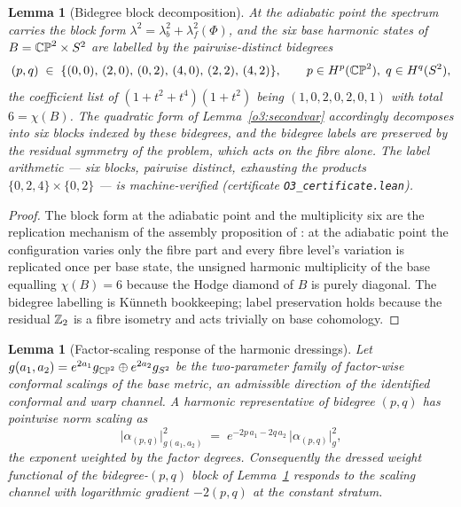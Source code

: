 \documentclass[11pt]{article}
\numberwithin{equation}{section}
\theoremstyle{plain}
\newtheorem{lemma}[theorem]{Lemma}
\theoremstyle{definition}
\theoremstyle{remark}
\begin{document}
\begin{lemma}[Bidegree block decomposition]\label{o3:blocks}
At the adiabatic point the spectrum carries the block form
$\lambda^{2} = \lambda_{b}^{2} + \lambda_{f}^{2}(\Phi)$, and the
six base harmonic states of $B = \mathbb{CP}^2 \times S^2$ are labelled
by the pairwise-distinct bidegrees
\[
(p, q) \;\in\; \{(0,0),\, (2,0),\, (0,2),\, (4,0),\, (2,2),\,
(4,2)\},
\qquad p \in H^{p}(\mathbb{CP}^2),\; q \in H^{q}(S^2),
\]
the coefficient list of $(1 + t^{2} + t^{4})(1 + t^{2})$ being
$(1, 0, 2, 0, 2, 0, 1)$ with total $6 = \chi(B)$. The quadratic
form of Lemma~\textup{\ref{o3:secondvar}} accordingly decomposes
into six blocks indexed by these bidegrees, and the bidegree labels
are preserved by the residual symmetry of the problem, which acts
on the fibre alone. The label arithmetic --- six blocks, pairwise
distinct, exhausting the products $\{0, 2, 4\} \times \{0, 2\}$ ---
is machine-verified (certificate \texttt{O3\_certificate.lean}).
\end{lemma}

\begin{proof}
The block form at the adiabatic point and the multiplicity six are
the replication mechanism of the assembly proposition of
\cite{MEF3}: at the adiabatic point the configuration varies only
the fibre part and every fibre level's variation is replicated once
per base state, the unsigned harmonic multiplicity of the base
equalling $\chi(B) = 6$ because the Hodge diamond of $B$ is purely
diagonal. The bidegree labelling is K\"unneth bookkeeping; label
preservation holds because the residual $\mathbb{Z}_2$ is a fibre isometry
and acts trivially on base cohomology.
\end{proof}

\begin{lemma}[Factor-scaling response of the harmonic
dressings]\label{o3:scaling}
Let
$g(a_{1}, a_{2}) = e^{2a_{1}}g_{\mathbb{CP}^2} \oplus e^{2a_{2}}g_{S^2}$
be the two-parameter family of factor-wise conformal scalings of
the base metric, an admissible direction of the identified
conformal and warp channel. A harmonic representative of bidegree
$(p, q)$ has pointwise norm scaling as
\[
\bigl|\alpha_{(p,q)}\bigr|^{2}_{g(a_{1}, a_{2})}
\;=\; e^{-2p\,a_{1} - 2q\,a_{2}}\,
\bigl|\alpha_{(p,q)}\bigr|^{2}_{g},
\]
the exponent weighted by the factor degrees. Consequently the
dressed weight functional of the bidegree-$(p, q)$ block of
Lemma~\textup{\ref{o3:blocks}} responds to the scaling channel with
logarithmic gradient $-2(p, q)$ at the constant stratum.
\end{lemma}
\end{document}
